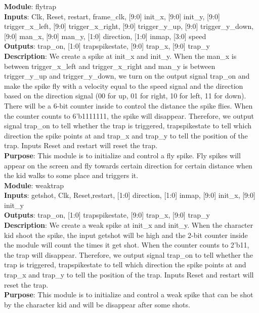 \documentclass[12pt]{article}
\begin{document}
\textbf{Module}: flytrap \\ 
\textbf{Inputs}: Clk, Reset, restart, frame\_clk, [9:0] init\_x, [9:0] init\_y, [9:0] trigger\_x\_left, [9:0] trigger\_x\_right, [9:0] trigger\_y\_up, [9:0] trigger\_y\_down, [9:0] man\_x, [9:0] man\_y, [1:0] direction, [1:0] inmap, [3:0] speed \\ 
\textbf{Outputs}: trap\_on, [1:0] trapspikestate, [9:0] trap\_x, [9:0] trap\_y \\
\textbf{Description}: We create a spike at init\_x and init\_y. When the man\_x is between trigger\_x\_left and trigger\_x\_right and man\_y is between trigger\_y\_up and trigger\_y\_down, we turn on the output signal trap\_on and make the spike fly with a velocity equal to the speed signal and the direction based on the direction signal (00 for up, 01 for right, 10 for left, 11 for down). There will be a 6-bit counter inside to control the distance the spike flies. When the counter counts to 6'b1111111, the spike will disappear. Therefore, we output signal trap\_on to tell whether the trap is triggered, trapspikestate to tell which direction the spike points at and trap\_x and trap\_y to tell the position of the trap. Inputs Reset and restart will reset the trap. \\ 
\textbf{Purpose}: This module is to initialize and control a fly spike. Fly spikes will appear on the screen and fly towards certain direction for certain distance when the kid walks to some place and triggers it. \\

\textbf{Module}: weaktrap \\ 
\textbf{Inputs}: getshot, Clk, Reset,restart, [1:0] direction, [1:0] inmap, [9:0] init\_x, [9:0] init\_y \\ 
\textbf{Outputs}: trap\_on, [1:0] trapspikestate, [9:0] trap\_x, [9:0] trap\_y \\
\textbf{Description}: We create a weak spike at init\_x and init\_y. When the character kid shoot the spike, the input getshot will be high and the 2-bit counter inside the module will count the times it get shot. When the counter counts to 2'b11, the trap will disappear. Therefore, we output signal trap\_on to tell whether the trap is triggered, trapspikestate to tell which direction the spike points at and trap\_x and trap\_y to tell the position of the trap. Inputs Reset and restart will reset the trap. \\ 
\textbf{Purpose}: This module is to initialize and control a weak spike that can be shot by the character kid and will be disappear after some shots. \\
\end{document}

